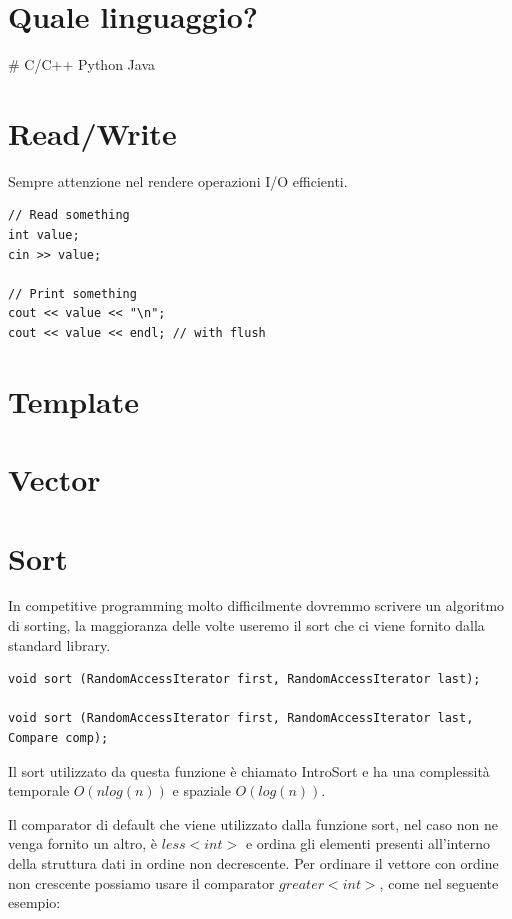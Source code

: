 \documentclass{article}
\begin{document}
\section{Quale linguaggio?}

\# C/C++ Python Java

\section{Read/Write}

Sempre attenzione nel rendere operazioni I/O efficienti.

\begin{lstlisting}
// Read something
int value;
cin >> value;

// Print something
cout << value << "\n";
cout << value << endl; // with flush 

\end{lstlisting}


\section{Template}



\section{Vector}


\section{Sort}

In competitive programming molto difficilmente dovremmo scrivere un algoritmo di sorting, la maggioranza delle volte useremo il sort che ci viene fornito dalla standard library.

\begin{lstlisting}
void sort (RandomAccessIterator first, RandomAccessIterator last);

void sort (RandomAccessIterator first, RandomAccessIterator last, Compare comp);
\end{lstlisting}

Il sort utilizzato da questa funzione è chiamato IntroSort e ha una complessità temporale $O(nlog(n))$ e spaziale $O(log(n))$.

Il comparator di default che viene utilizzato dalla funzione sort, nel caso non ne venga fornito un altro, è $less<int>$ e ordina gli elementi presenti all'interno della struttura dati in ordine non decrescente. Per ordinare il vettore con ordine non crescente possiamo usare il comparator $greater<int>$, come nel seguente esempio:
\end{document}
